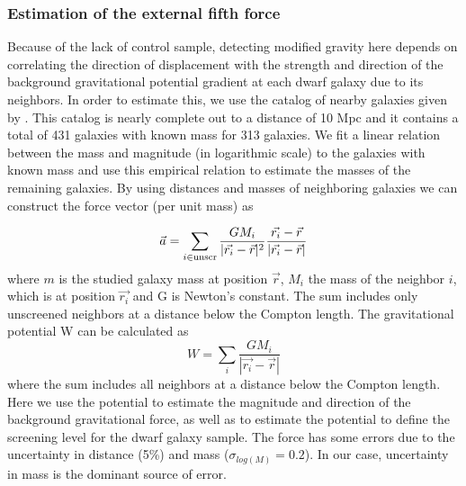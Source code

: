 \documentclass[useAMS,usenatbib,twocolumn]{mn2e}
\begin{document}
\subsubsection{Estimation of the external fifth force}
Because of the lack of control sample, detecting modified gravity here
depends on correlating the direction of displacement with the strength
and direction of the background gravitational potential gradient at
each dwarf galaxy due to its neighbors.  In order to estimate this,
we use the
catalog of  nearby galaxies given by \citet{kar04}. This catalog is nearly
complete out to a distance of 10 Mpc and it contains a total of 431 galaxies
with known mass for 313 galaxies. We fit a linear relation between the
mass and magnitude (in logarithmic scale) to the galaxies with known mass and
use this empirical relation to estimate the masses of the remaining galaxies.
By using distances and masses of neighboring galaxies we can construct the
force vector (per unit mass) as 

\begin{equation}
\vec{a} =\sum_{i \in {\rm unscr}}{\frac{G M_i}{|\vec{r_i}
-\vec{r}|^2} \frac{\vec{r_i}
-\vec{r}}{|\vec{r_i} -\vec{r}|} }
\label{eq:accelaration}
\end{equation}
where $m$ is the studied galaxy mass at position $\vec{r}$,
 $M_i$ the mass of the
neighbor $i$, which is at position $\vec{r_i}$ and G is Newton's
constant. The sum includes only unscreened neighbors at a distance below the
Compton length. 
The gravitational potential W can be calculated as 
\begin{equation}
 W=\sum_i{\frac{G M_i}{|\vec{r_i} -\vec{r}|}  }
\end{equation}
where the sum includes all neighbors at a distance below the Compton length.
Here we use the potential to estimate the magnitude and direction of the
background gravitational force, as well as to estimate the potential to
define the screening level for the dwarf galaxy sample.
The force has some errors due to the
uncertainty in distance (5\%) and mass ($\sigma_{log(M)}=0.2$).
In our case, uncertainty in mass is the
dominant source of error. 
\end{document}
